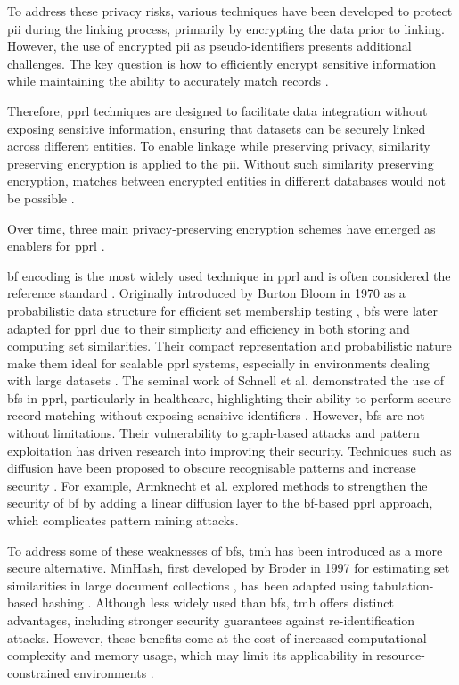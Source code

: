 To address these privacy risks, various techniques have been developed to protect \ac{pii} during the linking process, primarily by encrypting the data prior to linking. 
However, the use of encrypted \ac{pii} as pseudo-identifiers presents additional challenges.
The key question is how to efficiently encrypt sensitive information while maintaining the ability to accurately match records \cite{schnell2009privacy}.

Therefore, \ac{pprl} techniques are designed to facilitate data integration without exposing sensitive information, ensuring that datasets can be securely linked across different entities.
To enable linkage while preserving privacy, similarity preserving encryption is applied to the \ac{pii}.
Without such similarity preserving encryption, matches between encrypted entities in different databases would not be possible \cite{schnell2009privacy, vatsalan2017privacy}.

Over time, three main privacy-preserving encryption schemes have emerged as enablers for \ac{pprl} \cite{vidanage2020graph, schaefer2024}.

\ac{bf} encoding is the most widely used technique in \ac{pprl} and is often considered the reference standard \cite{schaefer2024}. 
Originally introduced by Burton Bloom in 1970 as a probabilistic data structure for efficient set membership testing \cite{bloom1970space}, \ac{bf}s were later adapted for \ac{pprl} due to their simplicity and efficiency in both storing and computing set similarities. 
Their compact representation and probabilistic nature make them ideal for scalable \ac{pprl} systems, especially in environments dealing with large datasets \cite{schnell2009privacy}. 
The seminal work of Schnell et al. demonstrated the use of \ac{bf}s in \ac{pprl}, particularly in healthcare, highlighting their ability to perform secure record matching without exposing sensitive identifiers \cite{schnell2009privacy}.
However, \ac{bf}s are not without limitations. 
Their vulnerability to graph-based attacks and pattern exploitation has driven research into improving their security. 
Techniques such as diffusion have been proposed to obscure recognisable patterns and increase security \cite{schaefer2024,armknecht2023strengthening}. 
For example, Armknecht et al. \cite{armknecht2023strengthening} explored methods to strengthen the security of \ac{bf} by adding a linear diffusion layer to the \ac{bf}-based \ac{pprl} approach, which complicates pattern mining attacks.

To address some of these weaknesses of \ac{bf}s, \ac{tmh} has been introduced as a more secure alternative. 
MinHash, first developed by Broder in 1997 for estimating set similarities in large document collections \cite{broder1997resemblance}, has been adapted using tabulation-based hashing \cite{smith2017secure}.
Although less widely used than \ac{bf}s, \ac{tmh} offers distinct advantages, including stronger security guarantees against re-identification attacks. 
However, these benefits come at the cost of increased computational complexity and memory usage, which may limit its applicability in resource-constrained environments \cite{smith2017secure}.

